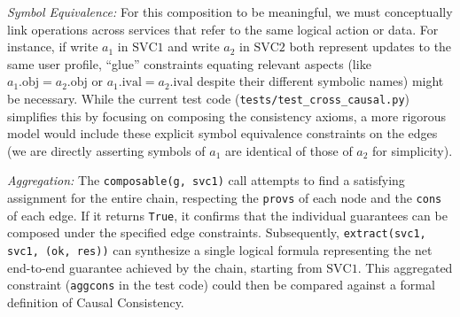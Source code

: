 \textit{Symbol Equivalence:} For this composition to be meaningful, we must
conceptually link operations across services that refer to the same logical
action or data. For instance, if write $a_1$ in $\text{SVC}1$ and
write $a_2$ in $\text{SVC}2$ both
represent updates to the same user profile, ``glue'' constraints
equating relevant
aspects (like $a_1.\text{obj} = a_2.\text{obj}$ or $a_1.\text{ival} =
  a_2.\text{ival}$ despite their
different symbolic names) might be necessary. While the current test
code (\texttt{tests/test\_cross\_causal.py})
simplifies this by focusing on composing the consistency axioms, a more rigorous
model would include these explicit symbol equivalence constraints on the edges
(we are directly asserting symbols of $a_1$ are identical of those of $a_2$ for
simplicity).

\textit{Aggregation:} The \texttt{composable(g, svc1)} call attempts
to find a satisfying
assignment for the entire chain, respecting the \texttt{provs} of
each node and the \texttt{cons} of
each edge. If it returns \texttt{True}, it confirms that the
individual guarantees can
be composed under the specified edge constraints. Subsequently,
\texttt{extract(svc1, svc1, (ok, res))} can
synthesize a single logical formula representing the net end-to-end guarantee
achieved by the chain, starting from $\text{SVC}1$. This aggregated
constraint (\texttt{aggcons} in
the test code) could then be compared against a formal definition of Causal
Consistency.
